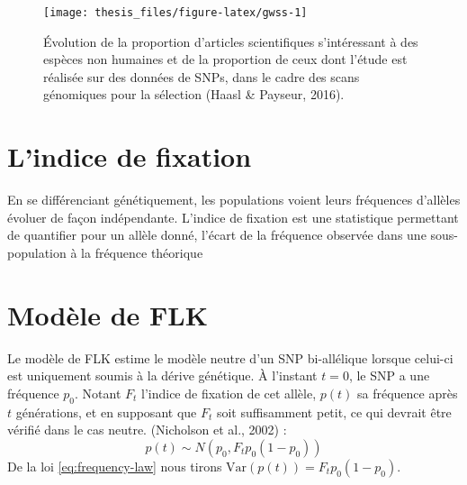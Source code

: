 \documentclass[12pt,a4paper,twoside]{ugathesis}
\theoremstyle{definition}
\theoremstyle{definition}
\theoremstyle{remark}
\begin{document}
\begin{figure}

{\centering \texttt{[image: thesis\_files/figure-latex/gwss-1]} 

}

\caption{Évolution de la proportion d'articles scientifiques
s'intéressant à des espèces non humaines et de la proportion de ceux
dont l'étude est réalisée sur des données de SNPs, dans le cadre des
scans génomiques pour la sélection (Haasl \& Payseur, 2016).}\label{fig:gwss}
\end{figure}
\section{L'indice de fixation}\label{lindice-de-fixation}

En se différenciant génétiquement, les populations voient leurs
fréquences d'allèles évoluer de façon indépendante. L'indice de fixation
est une statistique permettant de quantifier pour un allèle donné,
l'écart de la fréquence observée dans une sous-population à la fréquence
théorique

\section{Modèle de FLK}\label{modele-de-flk}

Le modèle de FLK estime le modèle neutre d'un SNP bi-allélique lorsque
celui-ci est uniquement soumis à la dérive génétique. À l'instant
\(t = 0\), le SNP a une fréquence \(p_0\). Notant \(F_t\) l'indice de
fixation de cet allèle, \(p(t)\) sa fréquence après \(t\) générations,
et en supposant que \(F_t\) soit suffisamment petit, ce qui devrait être
vérifié dans le cas neutre. (Nicholson et al., 2002) :
\begin{equation} 
  p(t) \sim N(p_0, F_t p_0 (1-p_0)) 
  \label{eq:frequency-law}
\end{equation}
De la loi \eqref{eq:frequency-law} nous tirons
\(\text{Var}(p(t)) = F_t p_0 (1-p_0)\).
\end{document}

